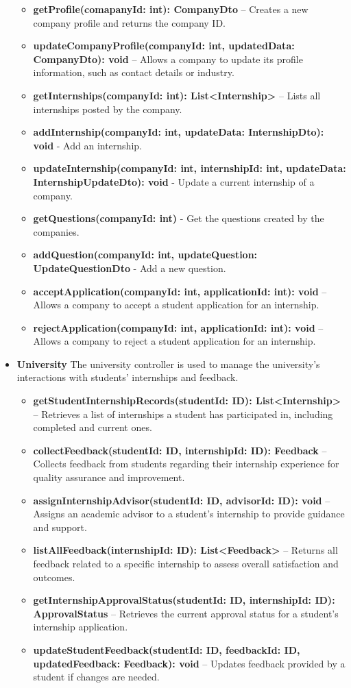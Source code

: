 \begin{itemize}
\begin{itemize}
    \item \textbf{getProfile(comapanyId: int): CompanyDto} – Creates a new company profile and returns the company ID.
    \item \textbf{updateCompanyProfile(companyId: int, updatedData: CompanyDto): void} – Allows a company to update its profile information, such as contact details or industry.
    \item \textbf{getInternships(companyId: int): List<Internship>} – Lists all internships posted by the company.
    \item \textbf{addInternship(companyId: int, updateData: InternshipDto): void} - Add an internship.
    \item \textbf{updateInternship(companyId: int, internshipId: int, updateData: InternshipUpdateDto): void} - Update a current internship of a company.
    \item \textbf{getQuestions(companyId: int)} - Get the questions created by the companies.
    \item \textbf{addQuestion(companyId: int, updateQuestion: UpdateQuestionDto} - Add a new question.
    \item \textbf{acceptApplication(companyId: int, applicationId: int): void} – Allows a company to accept a student application for an internship.
    \item \textbf{rejectApplication(companyId: int, applicationId: int): void} – Allows a company to reject a student application for an internship.
\end{itemize}

\item \textbf{University}
The university controller is used to manage the university's interactions with students' internships and feedback.
\begin{itemize}
    \item \textbf{getStudentInternshipRecords(studentId: ID): List<Internship>} – Retrieves a list of internships a student has participated in, including completed and current ones.
    \item \textbf{collectFeedback(studentId: ID, internshipId: ID): Feedback} – Collects feedback from students regarding their internship experience for quality assurance and improvement.
    \item \textbf{assignInternshipAdvisor(studentId: ID, advisorId: ID): void} – Assigns an academic advisor to a student's internship to provide guidance and support.
    \item \textbf{listAllFeedback(internshipId: ID): List<Feedback>} – Returns all feedback related to a specific internship to assess overall satisfaction and outcomes.
    \item \textbf{getInternshipApprovalStatus(studentId: ID, internshipId: ID): ApprovalStatus} – Retrieves the current approval status for a student's internship application.
    \item \textbf{updateStudentFeedback(studentId: ID, feedbackId: ID, updatedFeedback: Feedback): void} – Updates feedback provided by a student if changes are needed.
\end{itemize}




\end{itemize}
